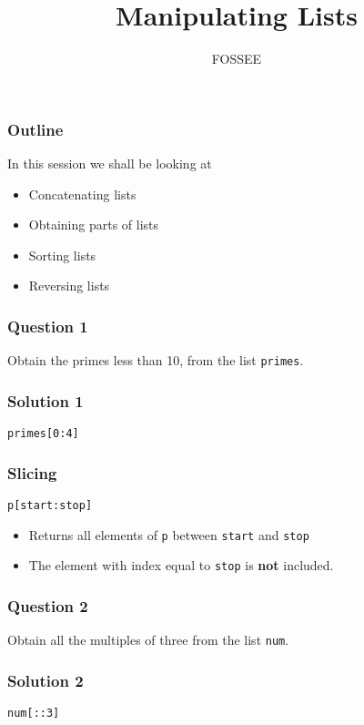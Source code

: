 \documentclass[presentation]{beamer}
\title{Manipulating Lists}
\author{FOSSEE}
\date{}
\begin{document}
\maketitle









\begin{frame}
\frametitle{Outline}
\label{sec-1}

  In this session we shall be looking at 
\begin{itemize}
\item Concatenating lists
\item Obtaining parts of lists
\item Sorting lists
\item Reversing lists
\end{itemize}
\end{frame}
\begin{frame}
\frametitle{Question 1}
\label{sec-2}

  Obtain the primes less than 10, from the list \texttt{primes}. 
\end{frame}
\begin{frame}[fragile]
\frametitle{Solution 1}
\label{sec-3}

\lstset{language=Python}
\begin{lstlisting}
primes[0:4]
\end{lstlisting}
\end{frame}
\begin{frame}[fragile]
\frametitle{Slicing}
\label{sec-4}

\lstset{language=Python}
\begin{lstlisting}
p[start:stop]
\end{lstlisting}
\begin{itemize}
\item Returns all elements of \texttt{p} between \texttt{start} and \texttt{stop}
\item The element with index equal to \texttt{stop} is \textbf{not} included.
\end{itemize}
\end{frame}
\begin{frame}
\frametitle{Question 2}
\label{sec-5}

  Obtain all the multiples of three from the list \texttt{num}.
\end{frame}
\begin{frame}[fragile]
\frametitle{Solution 2}
\label{sec-6}

\lstset{language=Python}
\begin{lstlisting}
num[::3]
\end{lstlisting}
\end{frame}
\end{document}
